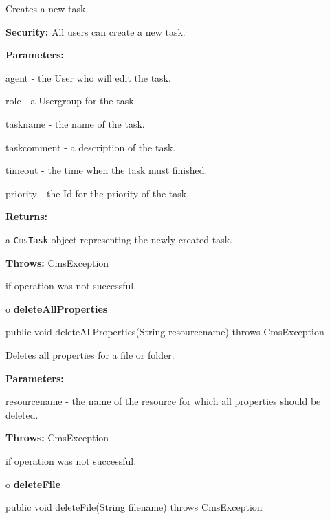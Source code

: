 \begin{description}
\htmlDD Creates a new task. 

{\bf Security:} All users can create a new task. 

\begin{description}
\item {\bf Parameters:}  

agent - the User who will edit the task.  

role - a Usergroup for the task.  

taskname - the name of the task.  

taskcomment - a description of the task.  

timeout - the time when the task must finished.  

priority - the Id for the priority of the task.  
\item {\bf Returns:}  

a {\tt CmsTask} object representing the newly created task.  
\item {\bf Throws:} CmsException  

if operation was not successful.  
\end{description}

\end{description}

o {\bf deleteAllProperties} 

\begin{PRE}
 public void deleteAllProperties(String resourcename) throws CmsException
\end{PRE}

\begin{description}
\htmlDD Deletes all properties for a file or folder. 

\begin{description}
\item {\bf Parameters:}  

resourcename - the name of the resource for which all properties should be
deleted.  
\item {\bf Throws:} CmsException  

if operation was not successful.  
\end{description}

\end{description}

o {\bf deleteFile} 

\begin{PRE}
 public void deleteFile(String filename) throws CmsException
\end{PRE}

